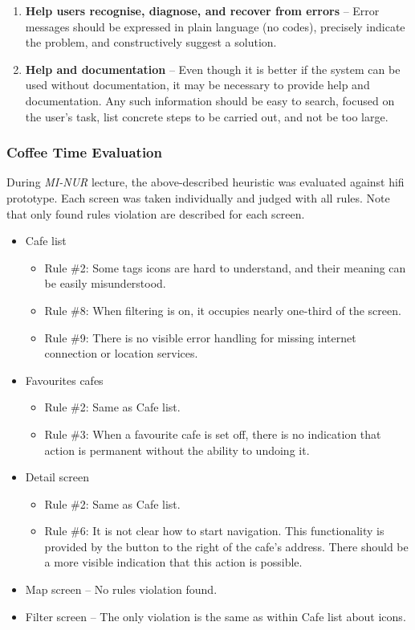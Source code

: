 \begin{enumerate}
    \item \textbf{Help users recognise, diagnose, and recover from errors} -- Error messages should be expressed in plain language (no codes), precisely indicate the problem, and constructively suggest a solution.
    
    \item \textbf{Help and documentation} -- Even though it is better if the system can be used without documentation, it may be necessary to provide help and documentation. Any such information should be easy to search, focused on the user's task, list concrete steps to be carried out, and not be too large.
\end{enumerate}

\subsubsection{Coffee Time Evaluation}
During \textit{MI-NUR} lecture, the above-described heuristic was evaluated against \gls{hifi} prototype. Each screen was taken individually and judged with all rules. Note that only found rules violation are described for each screen.

\begin{itemize}
    \item Cafe list
    \begin{itemize}
        \item Rule \#2: Some tags icons are hard to understand, and their meaning can be easily misunderstood. 
        \item Rule \#8: When filtering is on, it occupies nearly one-third of the screen.
        \item Rule \#9: There is no visible error handling for missing internet connection or location services.
    \end{itemize}
    \item Favourites cafes
    \begin{itemize}
        \item Rule \#2: Same as Cafe list.
        \item Rule \#3: When a favourite cafe is set off, there is no indication that action is permanent without the ability to undoing it. 
    \end{itemize}
    \item Detail screen
    \begin{itemize}
        \item Rule \#2: Same as Cafe list.
        \item Rule \#6: It is not clear how to start navigation. This functionality is provided by the button to the right of the cafe's address. There should be a more visible indication that this action is possible.
    \end{itemize}
    \item Map  screen -- No rules violation found. 
    \item Filter screen -- The only violation is the same as within Cafe list about icons.
\end{itemize}

